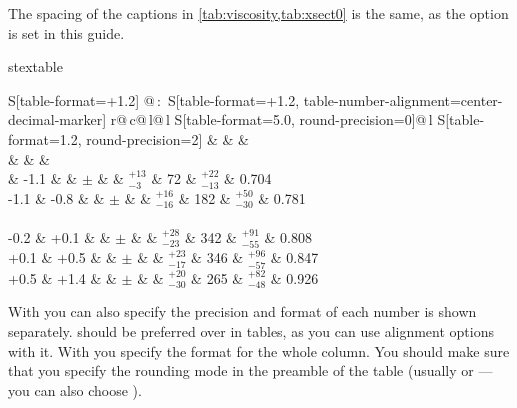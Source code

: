 The spacing of the captions in \cref{tab:viscosity,tab:xsect0} is the same,
as the option  is set in this guide.

\begin{table}[htbp]
\begin{tcblisting}{stextable}
\caption{A selection of cross-section measurements!
  Typeset using the  macro.}%
\label{tab:xsect0}
\centering
\renewcommand{\arraystretch}{1.2}
\begin{tabular}{
    S[table-format=+1.2] @{\,:\,}
    S[table-format=+1.2, table-number-alignment=center-decimal-marker]
    r@{\,}c@{\,}l@{\,}l
    S[table-format=5.0, round-precision=0]@{\,}l
    S[table-format=1.2, round-precision=2]}
  \toprule
   &  
  &  & \Cbhad \\
   &  &
   & \\
   & -1.1 &  &
  \(\pm\) &  &
  \(^{+13}_{-3}\) &  72 & \(^{+22}_{-13}\) & 0.704 \\
  -1.1 & -0.8 &  &
  \(\pm\) &  &
  \(^{+16}_{-16}\) & 182 & \(^{+50}_{-30}\) & 0.781 \\
  \\
  -0.2 & +0.1 &  &
  \(\pm\) &  &
  \(^{+28}_{-23}\) & 342 & \(^{+91}_{-55}\) & 0.808 \\
  +0.1 & +0.5 &  &
  \(\pm\) &  &
  \(^{+23}_{-17}\) & 346 & \(^{+96}_{-57}\) & 0.847 \\
  +0.5 & +1.4 &  &
  \(\pm\) &  &
  \(^{+20}_{-30}\) & 265 & \(^{+82}_{-48}\) & 0.926 \\
  \bottomrule
\end{tabular}
\end{tcblisting}
\end{table}

With  you can also specify the precision and format of each
number is shown separately.
 should be preferred over  in tables,
as you can use alignment options with it.
With  you specify the format for the whole column.
You should make sure
that you specify the rounding mode in the preamble of the table (usually
 or  --- you can also choose ).

